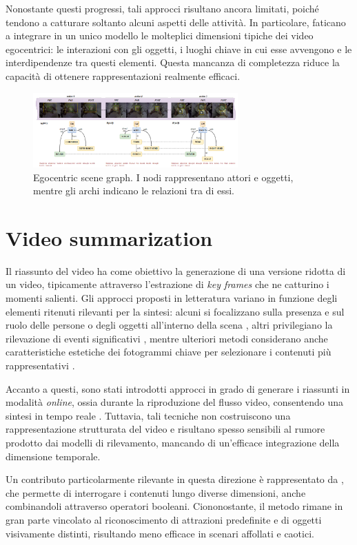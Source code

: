 Nonostante questi progressi, tali approcci risultano ancora limitati, poiché tendono a catturare soltanto alcuni aspetti delle attività. In particolare, faticano a integrare in un unico modello le molteplici dimensioni tipiche dei video egocentrici: le interazioni con gli oggetti, i luoghi chiave in cui esse avvengono e le interdipendenze tra questi elementi. Questa mancanza di completezza riduce la capacità di ottenere rappresentazioni realmente efficaci.

\begin{figure}[H]
    \centering
    \includegraphics[width=0.7\textwidth]{Images/ego_graph.png}
    \caption{Egocentric scene graph. I nodi rappresentano attori e oggetti, mentre gli archi indicano le relazioni tra di essi.}
    \label{fig:ego_scene_graph}
\end{figure}

\section{Video summarization}

Il riassunto del video ha come obiettivo la generazione di una versione ridotta di un video, tipicamente attraverso l'estrazione di \emph{key frames} che ne catturino i momenti salienti. Gli approcci proposti in letteratura variano in funzione degli elementi ritenuti rilevanti per la sintesi: alcuni si focalizzano sulla presenza e sul ruolo delle persone o degli oggetti all'interno della scena \cite{6247820}, altri privilegiano la rilevazione di eventi significativi \cite{Lu_2013_CVPR}, mentre ulteriori metodi considerano anche caratteristiche estetiche dei fotogrammi chiave per selezionare i contenuti più rappresentativi \cite{10.1007/978-3-319-10602-1_19}. 

Accanto a questi, sono stati introdotti approcci in grado di generare i riassunti in modalità \emph{online}, ossia durante la riproduzione del flusso video, consentendo una sintesi in tempo reale \cite{Lin_2015_ICCV_Workshops,Zhao_2014_CVPR}. Tuttavia, tali tecniche non costruiscono una rappresentazione strutturata del video e risultano spesso sensibili al rumore prodotto dai modelli di rilevamento, mancando di un'efficace integrazione della dimensione temporale.

Un contributo particolarmente rilevante in questa direzione è rappresentato da \cite{Xiong_2015_ICCV}, che permette di interrogare i contenuti lungo diverse dimensioni, anche combinandoli attraverso operatori booleani. Ciononostante, il metodo rimane in gran parte vincolato al riconoscimento di attrazioni predefinite e di oggetti visivamente distinti, risultando meno efficace in scenari affollati e caotici.